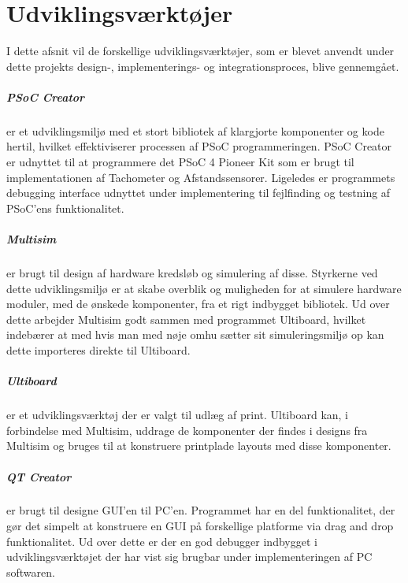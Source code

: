 \chapter{Udviklingsværktøjer} \label{ch:udviklingsvaerktoejer}
I dette afsnit vil de forskellige udviklingsværktøjer, som er blevet anvendt under dette projekts design-, implementerings- og integrationsproces, blive gennemgået.

\paragraph{PSoC Creator} er et udviklingsmiljø med et stort bibliotek af klargjorte komponenter og kode hertil, hvilket effektiviserer processen af PSoC programmeringen.
PSoC Creator er udnyttet til at programmere det PSoC 4 Pioneer Kit som er brugt til implementationen af Tachometer og Afstandssensorer. Ligeledes er programmets debugging interface udnyttet under implementering til fejlfinding og testning af PSoC'ens funktionalitet.

\paragraph{Multisim} er brugt til design af hardware kredsløb og simulering af disse. Styrkerne ved dette udviklingsmiljø er at skabe overblik og muligheden for at simulere hardware moduler, med de ønskede komponenter, fra et rigt indbygget bibliotek. Ud over dette arbejder Multisim godt sammen med programmet Ultiboard, hvilket indebærer at med hvis man med nøje omhu sætter sit simuleringsmiljø op kan dette importeres direkte til Ultiboard.

\paragraph{Ultiboard} er et udviklingsværktøj der er valgt til udlæg af print. Ultiboard kan, i forbindelse med Multisim, uddrage de komponenter der findes i designs fra Multisim og bruges til at konstruere printplade layouts med disse komponenter.

\paragraph{QT Creator} er brugt til designe GUI'en til PC'en. Programmet har en del funktionalitet, der gør det simpelt at konstruere en GUI på forskellige platforme via drag and drop funktionalitet. Ud over dette er der en god debugger indbygget i udviklingsværktøjet der har vist sig brugbar under implementeringen af PC softwaren.

